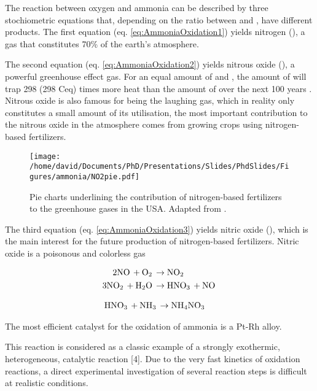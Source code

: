 The reaction between oxygen and ammonia can be described by three stochiometric equations that, depending on the ratio between \ammonia and \dioxygen, have different products.
The first equation (eq. \ref{eq:AmmoniaOxidation1}) yields nitrogen (\nitrogen), a gas that constitutes 70\% of the earth's atmosphere.

The second equation (eq. \ref{eq:AmmoniaOxidation2}) yields nitrous oxide (\nitrousoxide), a powerful greenhouse effect gas.
For an equal amount of \nitrousoxide and \carbondioxide, the amount of \nitrousoxide will trap 298 (298 Ceq) times more heat than the amount of \carbondioxide over the next 100 years \parencite{MITCLIMATE}.
Nitrous oxide is also famous for being the laughing gas, which in reality only constitutes a small amount of its utilisation, the most important contribution to the nitrous oxide in the atmosphere comes from growing crops using nitrogen-based fertilizers.

\begin{figure}[!htb]
    \centering
    \texttt{[image: /home/david/Documents/PhD/Presentations/Slides/PhdSlides/Figures/ammonia/NO2pie.pdf]}
    \caption{Pie charts underlining the contribution of nitrogen-based fertilizers to the greenhouse gases in the USA.
    Adapted from \cite{EPAGreenhouseGases}.}
    \label{fig:PieGreenhouseNO2}
\end{figure}

The third equation (eq. \ref{eq:AmmoniaOxidation3}) yields nitric oxide (\nitricoxide), which is the main interest for the future production of nitrogen-based fertilizers.
Nitric oxide is a poisonous and colorless gas

\begin{align}
    \label{eq:Stage2}
    2 \nitricoxide + \dioxygen & \rightarrow \nitrogendioxide \\
    3 \nitrogendioxide + \water & \rightarrow \nitricacid + \nitricoxide
\end{align}

\begin{align}
    \label{eq:Stage3}
    \nitricacid + \ammonia & \rightarrow \ammoniumnitrate
\end{align}


The most efficient catalyst for the oxidation of ammonia is a Pt-Rh alloy.


This reaction is considered as a classic example of a strongly exothermic, heterogeneous, catalytic reaction [4].
Due to the very fast kinetics of oxidation reactions, a direct experimental investigation of several reaction steps is difficult at realistic conditions.

